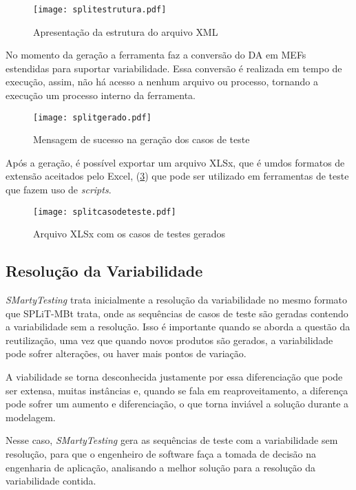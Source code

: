 \begin{figure}[h!]
	\centering
	\texttt{[image: splitestrutura.pdf]}
	\caption{Apresentação da estrutura do arquivo XML}
	\label{fig:split_estrutura}
\end{figure}


No momento da geração a ferramenta faz a conversão do DA em MEFs estendidas para suportar variabilidade. Essa conversão é realizada em tempo de execução, assim, não há acesso a nenhum arquivo ou processo, tornando a execução um processo interno da ferramenta.

\begin{figure}[h!]
	\centering
	\texttt{[image: splitgerado.pdf]}
	\caption{Mensagem de sucesso na geração dos casos de teste}
	\label{fig:split_gerado}
\end{figure}

Após a geração, é possível exportar um arquivo XLSx, que é umdos formatos de extensão aceitados pelo Excel, (\ref{fig:split_casodeteste}) que pode ser utilizado em ferramentas de teste que fazem uso de \textit{scripts}.

\begin{figure}[h!]
	\centering
	\texttt{[image: splitcasodeteste.pdf]}
	\caption{Arquivo XLSx com os casos de testes gerados}
	\label{fig:split_casodeteste}
\end{figure}
\newpage
\subsection{Resolução da Variabilidade}
\label{cap3subsec:solucao_variabilidade}

\textit{SMartyTesting} trata inicialmente a resolução da variabilidade no mesmo formato que SPLiT-MBt trata, onde as sequências de casos de teste são geradas contendo a variabilidade sem a resolução. Isso é importante quando se aborda a questão da reutilização, uma vez que quando novos produtos são gerados, a variabilidade pode sofrer alterações, ou haver mais pontos de variação. 

A viabilidade se torna desconhecida justamente por essa diferenciação que pode ser extensa, muitas instâncias e, quando se fala em reaproveitamento, a diferença pode sofrer um aumento e diferenciação, o que torna inviável a solução durante a modelagem.

Nesse caso, \textit{SMartyTesting} gera as sequências de teste com a variabilidade sem resolução, para que o engenheiro de software faça a tomada de decisão na engenharia de aplicação, analisando a melhor solução para a resolução da variabilidade contida.   


